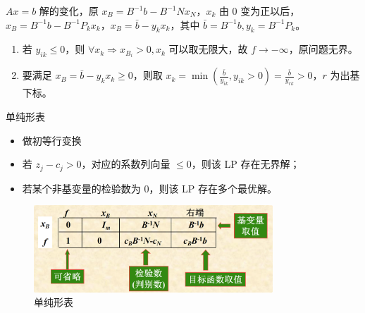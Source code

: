 \begin{remark}
\begin{itemize}
            $Ax = b$ 解的变化，原 $x_B = B^{-1}b - B^{-1}Nx_N$，$x_k$ 由 0 变为正以后，$x_B = B^{-1}b - B^{-1}P_kx_k$，$x_B = \bar{b}-y_{k} x_{k}$，其中 $\bar{b} = B^{-1}b,y_k = B^{-1}P_k$。
            \begin{enumerate}
                \item 若 $y_{ik}\le 0$，则 $\forall x_k \Longrightarrow x_{B_i} > 0,x_k$ 可以取无限大，故 $f\to -\infty$，原问题无界。
                \item 要满足 $x_B = \bar{b}-y_{k} x_{k} \ge 0$，则取 $x_k = \min(\frac{\bar{b}}{y_{ik}},y_{ik}>0) = \frac{\bar{b}}{y_{rk}} > 0$，$r$ 为出基下标。
            \end{enumerate}
    \end{itemize}
\end{remark}

\begin{remark}
    单纯形表
    \begin{itemize}
        \item 做初等行变换
        \item 若 $z_j - c_j > 0$，对应的系数列向量 $\le 0$，则该 LP 存在无界解；
        \item 若某个非基变量的检验数为 0，则该 LP 存在多个最优解。
    \end{itemize}
    \begin{figure}[htbp]
        \centering
        \includegraphics[width=0.8\textwidth]{./figures/img1.png}
        \caption{单纯形表 \label{fig1}}
    \end{figure}
\end{remark}

